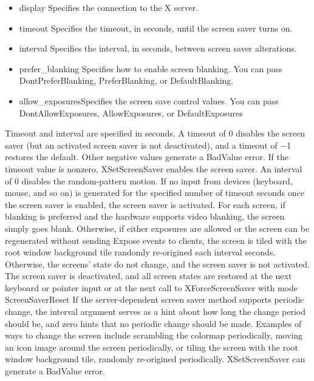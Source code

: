 \documentclass{report}
\begin{document}
\begin{itemize}
\begin{itemize}
                \item display Specifies the connection to the X server.
                \item timeout Specifies the timeout, in seconds, until the screen saver turns on.
                \item interval Specifies the interval, in seconds, between screen saver alterations.
                \item prefer\_blanking Specifies how to enable screen blanking. You can pass DontPreferBlanking, PreferBlanking, or DefaultBlanking.
                \item allow\_exposuresSpecifies the screen save control values. You can pass DontAllowExposures, AllowExposures, or DefaultExposures
            \end{itemize}
            Timeout and interval are specified in seconds. A timeout of 0 disables the screen saver (but an activated screen saver is not deactivated), and a timeout of −1 restores the default. Other negative values generate a BadValue error. If the timeout value is nonzero, XSetScreenSaver enables the screen saver. An interval of 0 disables the random-pattern motion. If no input from devices (keyboard, mouse, and so on) is generated for the specified number of timeout seconds once the screen saver is enabled, the screen saver is activated.
            \bigbreak \noindent 
            For each screen, if blanking is preferred and the hardware supports video blanking, the screen simply goes blank. Otherwise, if either exposures are allowed or the screen can be regenerated without sending Expose events to clients, the screen is tiled with the root window background tile randomly re-origined each interval seconds. Otherwise, the screens’ state do not change, and the screen saver is not activated. The screen saver is deactivated, and all screen states are restored at the next keyboard or pointer input or at the next call to XForceScreenSaver with mode ScreenSaverReset
            \bigbreak \noindent 
            If the server-dependent screen saver method supports periodic change, the interval argument serves as a hint about how long the change period should be, and zero hints that no periodic change should be made. Examples of ways to change the screen include scrambling the colormap periodically, moving an icon image around the screen periodically, or tiling the screen with the root window background tile, randomly re-origined periodically.
            \bigbreak \noindent 
            XSetScreenSaver can generate a BadValue error.
            \bigbreak \noindent 

\end{itemize}
\end{document}

